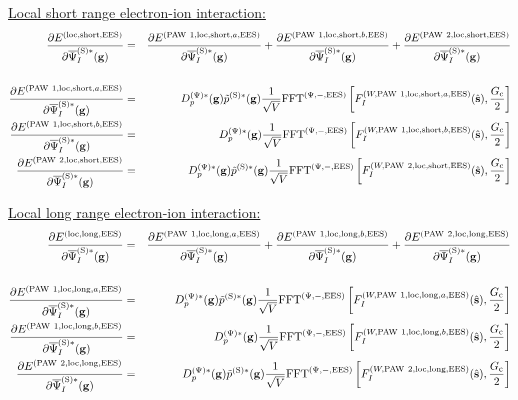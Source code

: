 \documentclass[paper=a4, fontsize=11pt]{article} %
\numberwithin{equation}{section} %
\numberwithin{figure}{section} %
\numberwithin{table}{section} %
\newcommand{\p}{\partial}
\newcommand{\bg}{{\bf{g}}}
\newcommand{\hs}{{\hat{\bf{s}}}}
\newcommand{\rS}{{\mathrm{S}}}
\newcommand{\rEES}{{\mathrm{EES}}}
\newcommand{\rshort}{{\mathrm{short}}}
\newcommand{\rlong}{{\mathrm{long}}}
\newcommand{\rP}{{\mathrm{PAW}}}
\newcommand{\rlo}{{\mathrm{loc}}}
\newcommand{\psigsc}{{\overline \Psi_I^{(\rS)*}(\bg)}}
\newcommand{\hGc}{{\frac{G_{\mathrm{c}}}{2}}}
\newcommand{\Dpgc}{{D^{(\Psi)*}_p(\bg)}}
\newcommand{\FFTpiEES}{{\mathrm{FFT}^{(\Psi,-,\rEES)}}}
\begin{document}
\underline{Local short range electron-ion interaction:}
\begin{eqnarray}
\frac{\p E^{(\rlo,\rshort,\rEES)} }{\p \psigsc}
&=& \frac{\p E^{(\rP\ 1,\rlo,\rshort,a,\rEES)}}{\p \psigsc}+\frac{\p E^{(\rP\ 1,\rlo,\rshort,b,\rEES)}}{\p \psigsc} + \frac{\p E^{(\rP\ 2,\rlo,\rshort,\rEES)}}{\p \psigsc}\nonumber\\
\\
\label{cl:dElocshort1adp}
\frac{\p E^{(\rP\ 1,\rlo,\rshort,a,\rEES)}}{\p \psigsc}
&=& \Dpgc \tilde p^{(\rS)*}(\bg)\frac{1}{\sqrt{V}} \FFTpiEES \left[F_I^{(W,\rP\ 1,\rlo,\rshort,a,\rEES)}(\hs),\hGc \right] \\
\label{cl:dElocshort1bdp}
\frac{\p E^{(\rP\ 1,\rlo,\rshort,b,\rEES)}}{\p \psigsc}
&=& \Dpgc \frac{1}{\sqrt V} \FFTpiEES \left[F_I^{(W,\rP\ 1,\rlo,\rshort,b,\rEES)}(\hs),\hGc\right]\\
\label{cl:dElocshort2dp}
\frac{\p E^{(\rP\ 2,\rlo,\rshort,\rEES)}}{\p \psigsc}
&=& \Dpgc\tilde p^{(\rS)*}(\bg)\frac{1}{\sqrt{V}}\FFTpiEES \left[F_I^{(W,\rP\ 2,\rlo,\rshort,\rEES)}(\hs),\hGc \right]
\end{eqnarray}

\underline{Local long range electron-ion interaction:}
\begin{eqnarray}
\frac{\p E^{(\rlo,\rlong,\rEES)}}{\p \psigsc}
&=& \frac{\p E^{(\rP\ 1,\rlo,\rlong,a,\rEES)}}{\p \psigsc}+\frac{\p E^{(\rP\ 1,\rlo,\rlong,b,\rEES)}}{\p \psigsc} + \frac{\p E^{(\rP\ 2,\rlo,\rlong,\rEES)}}{\p \psigsc}\nonumber\\
\\
\label{cl:dEloclong1adp}
\frac{\p E^{(\rP\ 1,\rlo,\rlong,a,\rEES)}}{\p \psigsc}
&=& \Dpgc \tilde p^{(\rS)*}(\bg)\frac{1}{\sqrt{V}} \FFTpiEES \left[F_I^{(W,\rP\ 1,\rlo,\rlong,a,\rEES)}(\hs) ,\hGc \right] \\
\label{cl:dEloclong1bdp}
\frac{\p E^{(\rP\ 1,\rlo,\rlong,b,\rEES)}}{\p \psigsc}
&=& \Dpgc \frac{1}{\sqrt V} \FFTpiEES \left[F_I^{(W,\rP\ 1,\rlo,\rlong,b,\rEES)}(\hs),\hGc\right]\\
\label{cl:dEloclong2dp}
\frac{\p E^{(\rP\ 2,\rlo,\rlong,\rEES)}}{\p \psigsc}
&=& \Dpgc\tilde p^{(\rS)*}(\bg)\frac{1}{\sqrt{V}}\FFTpiEES \left[F_I^{(W,\rP\ 2,\rlo,\rlong,\rEES)}(\hs) ,\hGc \right]
\end{eqnarray}
\end{document}
